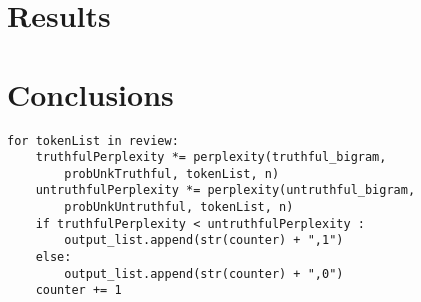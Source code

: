 \documentclass[11pt]{article}
\begin{document}
\section{Results}

\section{Conclusions}


\begin{lstlisting}[frame=single]
for tokenList in review:
    truthfulPerplexity *= perplexity(truthful_bigram,
        probUnkTruthful, tokenList, n)
    untruthfulPerplexity *= perplexity(untruthful_bigram,
        probUnkUntruthful, tokenList, n)
    if truthfulPerplexity < untruthfulPerplexity :
        output_list.append(str(counter) + ",1")
    else:
        output_list.append(str(counter) + ",0")
    counter += 1
\end{lstlisting}
\end{document}
